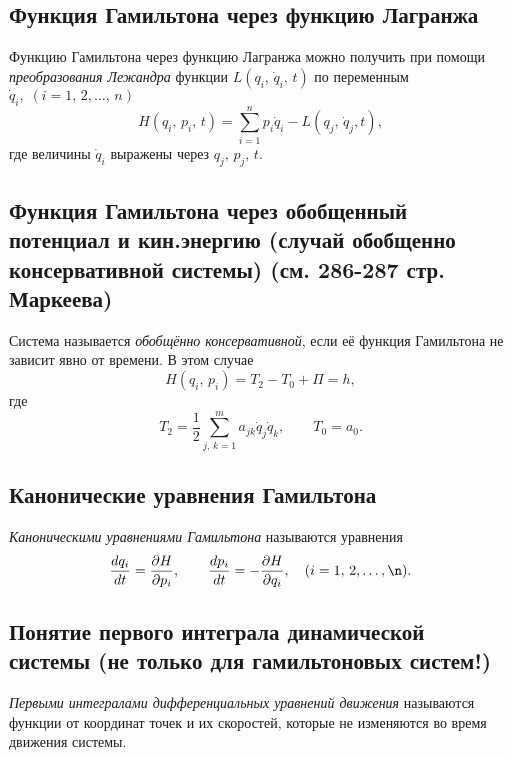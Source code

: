\documentclass[a4paper,12pt]{article}
\begin{document}
\subsection{Функция Гамильтона через функцию Лагранжа}
Функцию Гамильтона через функцию Лагранжа можно получить при помощи 
\emph{преобразования Лежандра} функции $L(q_i,\,\dot{q}_i,\,t)$ по переменным
$\dot{q}_i,\;(i=1,\,2,\ldots,\,n)$
\[
	H(q_i,\,p_i,\,t)= \sum_{i=1}^{n} p_i \dot{q}_i -L(q_j,\,\dot{q}_j,t)
,\]
где величины $\dot{q}_i$ выражены через $q_j,\,p_j,\,t$.
\subsection{Функция Гамильтона через обобщенный потенциал и кин.энергию (случай
обобщенно консервативной системы) (см. 286-287 стр. Маркеева)}
Система называется \emph{обобщённо консервативной}, если её функция Гамильтона
не зависит явно от времени. В этом случае
\[
	H(q_i,\,p_i)=T_2-T_0+\Pi=h
,\] 
где
\[
 T_2=\frac{1}{2}\sum_{j,\,k=1}^{m} a_{jk}\dot{q}_j\dot{q}_k,\qquad T_0=a_0
.\] 
\subsection{Канонические уравнения Гамильтона}
\begin{dfn}
	\emph{Каноническими уравнениями Гамильтона} называются уравнения
	\[
	\frac{dq_i}{dt}=\frac{\partial H}{\partial p_i},\qquad
	\frac{dp_i}{dt}=- \frac{\partial H}{\partial q_i}, \quad
	(i=1,\,2,\ldots,\n)
	.\] 
\end{dfn}
\subsection{Понятие первого интеграла динамической системы (не только для
гамильтоновых систем!)}
\begin{dfn}
	\emph{Первыми интегралами дифференциальных уравнений движения}
	называются функции от координат точек и их скоростей, которые не
	изменяются во время движения системы.
\end{dfn}
\end{document}
